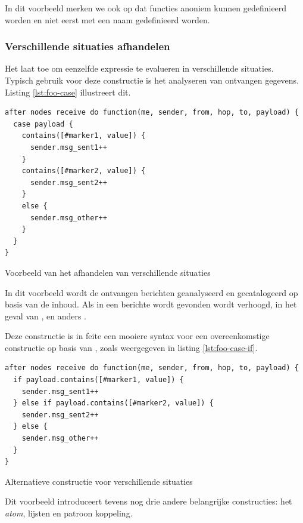 In dit voorbeeld merken we ook op dat functies anoniem kunnen gedefinieerd
worden en niet eerst met een naam gedefinieerd worden.

\subsubsection{Verschillende situaties afhandelen}

Het  laat toe om eenzelfde expressie te evalueren in
verschillende situaties. Typisch gebruik voor deze constructie is het
analyseren van ontvangen gegevens. Listing \ref{lst:foo-case} illustreert dit.

\begin{listing}[ht]
  \begin{verbatim}
after nodes receive do function(me, sender, from, hop, to, payload) {
  case payload {
    contains([#marker1, value]) {
      sender.msg_sent1++
    }
    contains([#marker2, value]) {
      sender.msg_sent2++
    }
    else {
      sender.msg_other++
    }
  }
}
  \end{verbatim}
  \vspace{-5mm}
  \caption{Voorbeeld van het afhandelen van verschillende situaties}
  \label{lst:foo-case}
\end{listing}

In dit voorbeeld wordt de ontvangen berichten geanalyseerd en gecatalogeerd op
basis van de inhoud. Als in een berichte  wordt gevonden wordt
 verhoogd, in het geval van , 
en anders .

Deze constructie is in feite een mooiere syntax voor een overeenkomstige
constructie op basis van , zoals weergegeven in listing
\ref{lst:foo-case-if}.

\begin{listing}[ht]
  \begin{verbatim}
after nodes receive do function(me, sender, from, hop, to, payload) {
  if payload.contains([#marker1, value]) {
    sender.msg_sent1++
  } else if payload.contains([#marker2, value]) {
    sender.msg_sent2++
  } else {
    sender.msg_other++
  }
}
  \end{verbatim}
  \vspace{-5mm}
  \caption{Alternatieve constructie voor verschillende situaties}
  \label{lst:foo-case-if}
\end{listing}

Dit voorbeeld introduceert tevens nog drie andere belangrijke constructies: het
\emph{atom}, lijsten en patroon koppeling.


